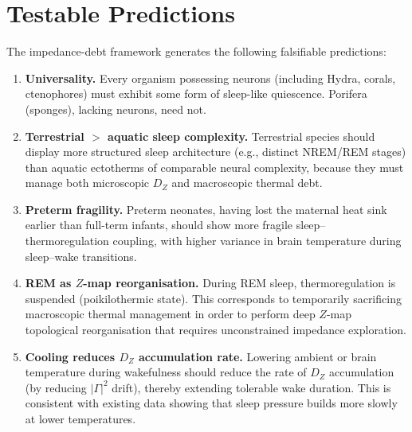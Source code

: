 ﻿\documentclass[aps,pre,twocolumn,superscriptaddress,floatfix]{revtex4-2}
\begin{document}
\section{Testable Predictions}
\label{sec:predictions}

The impedance-debt framework generates the following
falsifiable predictions:

\begin{enumerate}
  \item \textbf{Universality.}
    Every organism possessing neurons
    (including Hydra, corals, ctenophores)
    must exhibit some form of sleep-like quiescence.
    Porifera (sponges), lacking neurons, need not.

  \item \textbf{Terrestrial $>$ aquatic sleep complexity.}
    Terrestrial species should display more structured
    sleep architecture (e.g., distinct NREM/REM stages)
    than aquatic ectotherms of comparable neural complexity,
    because they must manage both microscopic $D_Z$
    and macroscopic thermal debt.

  \item \textbf{Preterm fragility.}
    Preterm neonates, having lost the maternal heat sink
    earlier than full-term infants, should show
    more fragile sleep--thermoregulation coupling,
    with higher variance in brain temperature
    during sleep--wake transitions.

  \item \textbf{REM as $Z$-map reorganisation.}
    During REM sleep, thermoregulation is suspended
    (poikilothermic state).
    This corresponds to temporarily sacrificing
    macroscopic thermal management in order to
    perform deep $Z$-map topological reorganisation
    that requires unconstrained impedance exploration.

  \item \textbf{Cooling reduces $D_Z$ accumulation rate.}
    Lowering ambient or brain temperature during
    wakefulness should reduce the rate of $D_Z$
    accumulation (by reducing $|\Gamma|^2$ drift),
    thereby extending tolerable wake duration.
    This is consistent with existing data showing
    that sleep pressure builds more slowly at lower
    temperatures.
\end{enumerate}


\end{document}
